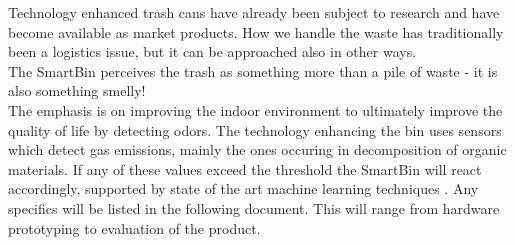 Technology enhanced trash cans have already been subject to research and have become available as market products.
How we handle the waste has traditionally been a logistics issue, but it can be approached also in other ways. \\
The SmartBin perceives the trash as something more than a pile of waste - it is also something smelly!\\
The emphasis is on improving the indoor environment to ultimately improve the quality of life by detecting odors.
The technology enhancing the bin uses sensors which detect gas emissions, mainly the ones occuring in decomposition of organic materials.
If any of these values exceed the threshold the SmartBin will react accordingly, supported by state of the art machine learning techniques .
Any specifics will be listed in the following document. This will range from hardware prototyping to evaluation of the product.